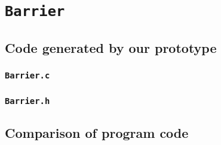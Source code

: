 \section{\texorpdfstring{\texttt{Barrier}}{Barrier}}
\label{Barrier-code-section}

\subsection{Code generated by our prototype}
\label{Barrier-code-our-subsection}

\subsubsection{\texttt{Barrier.c}}


\subsubsection{\texttt{Barrier.h}}



% 

% 

% 

% 

\subsection{Comparison of program code}
\label{Barrier-code-comparison-subsection}

